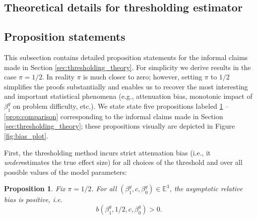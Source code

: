 \documentclass[12pt]{article}
\newtheorem{proposition}{Proposition}
\begin{document}
\printbibliography
\clearpage
\begin{appendices}
	\begin{refsection}
		\section{Theoretical details for thresholding estimator}\label{sec:appendix_theory}
		
		\subsection{Proposition statements}
		This subsection contains detailed proposition statements for the informal claims made in Section \ref{sec:thresholding_theory}. For simplicity we derive results in the case $\pi = 1/2$. In reality $\pi$ is much closer to zero; however, setting $\pi$ to $1/2$ simplifies the proofs substantially and enables us to recover the most interesting and important statistical phenomena (e.g., attenuation bias, monotonic impact of $\beta^g_1$ on problem difficulty, etc.). We state state five propositions labeled \ref{prop:att_bias} -- \ref{prop:comparison} corresponding to the informal claims made in Section \ref{sec:thresholding_theory}; these propositions visually are depicted in Figure \ref{fig:bias_plot}.
		
		First, the thresholding method incurs strict attenuation bias (i.e., it \textit{under}estimates the true effect size) for all choices of the threshold and over all possible values of the model parameters:
		\begin{proposition}\label{prop:att_bias} Fix $\pi = 1/2$. For all $(\beta^g_1, c, \beta^g_0) \in \mathbb{E}^3$, the asymptotic relative bias is positive, i.e. 
			$$b(\beta^g_1, 1/2, c, \beta^g_0) > 0.$$
		\end{proposition}
		

\end{refsection}
\end{appendices}
\end{document}
